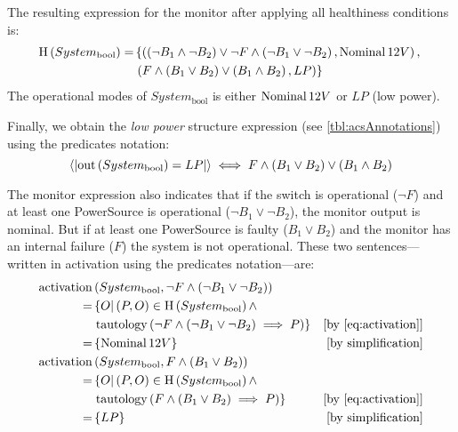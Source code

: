 The resulting expression for the monitor after applying all healthiness conditions is:
\begin{equation}
\label{eq:h-system1}
\begin{split}
  \mathrm{H}\left(System_{\mathrm{bool}}\right) = & \left\{
    \left(\left(\lnot B_1 \land \lnot B_2\right) \lor 
      \lnot F \land \left(\lnot B_1 \lor \lnot B_2\right), \mathop{\mathrm{Nominal}} 12V\right),\right.\\
    &\left.\left(F \land \left(B_1 \lor B_2\right) \lor \left(B_1 \land B_2\right), LP\right)
  \right\}
\end{split}
\end{equation}
%
The operational modes of $System_{\mathrm{bool}}$ is either $\mathop{\mathrm{Nominal}} 12V$ or $LP$ (low power).

Finally, we obtain the \emph{low power} structure expression (see \cref{tbl:acsAnnotations}) using the predicates notation:
\[
\left\langle\left| \mathrm{out}\left(System_{\mathrm{bool}}\right) = LP \right|\right\rangle \iff
F \land \left(B_1 \lor B_2\right) \lor \left(B_1 \land B_2\right)
\]

The monitor expression also indicates that if the switch is operational ($\lnot F$) and at least one PowerSource is operational ($\lnot B_1 \lor \lnot B_2$), the monitor output is nominal.
But if at least one PowerSource is faulty ($B_1 \lor B_2$) and the monitor has an internal failure ($F$) the system is not operational.
These two sentences---written in \ac{activation} using the predicates notation---are:
\begin{subequations}
\begin{align}
\activationcmd& \left(System_{\mathrm{bool}}, \lnot F \land \left(\lnot B_1 \lor \lnot B_2\right)\right) \nonumber\\
  = & \left\{ O | \left(P, O\right) \in \healthinesscmd\left(System_{\mathrm{bool}}\right) \land \right.\nonumber\\
    & \left.\tautology{\lnot F \land \left(\lnot B_1 \lor \lnot B_2\right) \implies P}
  \right\} & \text{[by \cref{eq:activation}]}\nonumber\\
  = & \left\{\Nominal{12V}\right\} & \text{[by simplification]}\\
\activationcmd& \left(System_{\mathrm{bool}}, F \land \left(B_1 \lor B_2\right) \right) \nonumber\\
  = & \left\{ O | \left(P, O\right) \in \healthinesscmd\left(System_{\mathrm{bool}}\right) \land \right.\nonumber\\
    & \left.\tautology{F \land \left(B_1 \lor B_2\right) \implies P}
  \right\} & \text{[by \cref{eq:activation}]}\nonumber\\
  = & \left\{LP\right\} & \text{[by simplification]}
\end{align}
\end{subequations}

